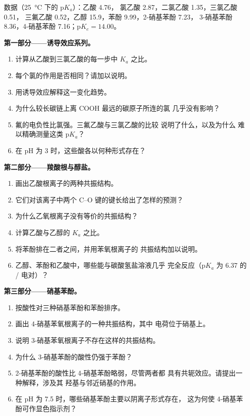 \begin{problem}
\label{pb:b1:electronic-effects:1}
数据（\qty{25}{\celsius} 下的 $\mathrm{p}K_a$）：乙酸 4.76，
氯乙酸 2.87，二氯乙酸 1.35，三氯乙酸 0.51，
三氟乙酸 0.52，乙醇 15.9，苯酚 9.99，2-硝基苯酚 7.23，
3-硝基苯酚 8.36，4-硝基苯酚 7.16；$\mathrm{p}K_e = 14.00$。

\medskip
\noindent\textbf{第一部分——诱导效应系列。}
\begin{enumerate}
  \item 计算从乙酸到三氯乙酸的每一步中
        $K_a$ 之比。
  \item 每个氯的作用是否相同？请加以说明。
  \item 用诱导效应解释这一变化趋势。
  \item 为什么较长碳链上离 COOH 最远的碳原子所连的氯
        几乎没有影响？
  \item 氟的电负性比氯强。三氟乙酸与三氯乙酸的比较
        说明了什么，以及为什么
        难以精确测量这类 $\mathrm{p}K_a$？
  \item 在 pH 为 3 时，这些酸各以何种形式存在？
\end{enumerate}

\medskip
\noindent\textbf{第二部分——羧酸根与醇盐。}
\begin{enumerate}[resume]
  \item 画出乙酸根离子的两种共振结构。
  \item 它们对该离子中两个 C--O 键的键长给出了怎样的预测？
  \item 为什么乙氧根离子没有等价的共振结构？
  \item 计算乙酸与乙醇的 $K_a$ 之比。
  \item 将苯酚排在二者之间，并用苯氧根离子的
        共振结构加以说明。
  \item 乙醇、苯酚和乙酸中，哪些能与碳酸氢盐溶液几乎
        完全反应（$\mathrm{p}K_a$ 为 6.37 的
        / 电对）？
\end{enumerate}

\medskip
\noindent\textbf{第三部分——硝基苯酚。}
\begin{enumerate}[resume]
  \item 按酸性对三种硝基苯酚和苯酚排序。
  \item 画出 4-硝基苯氧根离子的一种共振结构，其中
        电荷位于硝基上。
  \item 说明 3-硝基苯氧根离子不存在这样的共振结构。
  \item 为什么 3-硝基苯酚的酸性仍强于苯酚？
  \item 2-硝基苯酚的酸性比 4-硝基苯酚略弱，尽管两者都
        具有共轭效应。请提出一种解释，涉及其
        羟基与邻近硝基的作用。
  \item 在 pH 为 7.5 时，哪些硝基苯酚主要以阴离子形式存在，
        这为何使 4-硝基苯酚可作显色指示剂？
\end{enumerate}


\end{problem}
